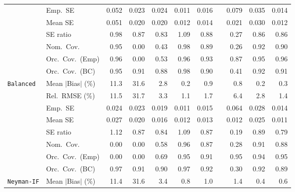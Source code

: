 \begin{landscape}
\begin{longtable}{llrrrrrrrrr}
 & Emp.\ SE & 0.052 & 0.023 & 0.024 & 0.011 & 0.016 &  & 0.079 & 0.035 & 0.014 \\
 & Mean SE & 0.051 & 0.020 & 0.020 & 0.012 & 0.014 &  & 0.021 & 0.030 & 0.012 \\
 & SE ratio & \cellcolor{rankone}0.98 & 0.87 & 0.83 & \cellcolor{ranktwo}1.09 & \cellcolor{rankthree}0.88 &  & 0.27 & 0.86 & 0.86 \\
 & Nom.\ Cov. & \cellcolor{rankone}0.95 & 0.00 & 0.43 & \cellcolor{ranktwo}0.98 & 0.89 &  & 0.26 & \cellcolor{ranktwo}0.92 & \cellcolor{rankthree}0.90 \\
 & Orc.\ Cov.\ (Emp) & \cellcolor{ranktwo}0.96 & 0.00 & 0.53 & \cellcolor{ranktwo}0.96 & \cellcolor{rankthree}0.93 &  & 0.87 & \cellcolor{rankone}0.95 & \cellcolor{ranktwo}0.96 \\
 & Orc.\ Cov.\ (BC) & \cellcolor{rankone}0.95 & \cellcolor{rankthree}0.91 & 0.88 & \cellcolor{ranktwo}0.98 & 0.90 &  & 0.41 & \cellcolor{ranktwo}0.92 & \cellcolor{rankthree}0.91 \\
\addlinespace[2pt]
\quad \texttt{Balanced} & Mean $|$Bias$|$ (\%) & 11.3 & 31.6 & 2.8 & \cellcolor{rankone}0.2 & 0.9 &  & \cellcolor{rankthree}0.8 & \cellcolor{rankone}0.2 & \cellcolor{ranktwo}0.3 \\
 & Rel.\ RMSE (\%) & 11.5 & 31.7 & 3.3 & \cellcolor{rankone}1.1 & \cellcolor{rankthree}1.7 &  & 6.4 & 2.8 & \cellcolor{ranktwo}1.4 \\
 & Emp.\ SE & 0.024 & 0.023 & 0.019 & 0.011 & 0.015 &  & 0.064 & 0.028 & 0.014 \\
 & Mean SE & 0.027 & 0.020 & 0.016 & 0.012 & 0.013 &  & 0.012 & 0.025 & 0.011 \\
 & SE ratio & \cellcolor{rankthree}1.12 & 0.87 & 0.84 & \cellcolor{rankone}1.09 & 0.87 &  & 0.19 & \cellcolor{ranktwo}0.89 & 0.79 \\
 & Nom.\ Cov. & 0.00 & 0.00 & 0.58 & \cellcolor{rankone}0.96 & 0.87 &  & 0.28 & \cellcolor{ranktwo}0.91 & \cellcolor{rankthree}0.88 \\
 & Orc.\ Cov.\ (Emp) & 0.00 & 0.00 & 0.69 & \cellcolor{rankone}0.95 & \cellcolor{rankthree}0.91 &  & \cellcolor{rankone}0.95 & \cellcolor{ranktwo}0.94 & \cellcolor{rankone}0.95 \\
 & Orc.\ Cov.\ (BC) & \cellcolor{rankone}0.97 & \cellcolor{rankthree}0.91 & 0.90 & \cellcolor{rankone}0.97 & \cellcolor{ranktwo}0.92 &  & 0.30 & \cellcolor{ranktwo}0.92 & 0.89 \\
\addlinespace[2pt]
\quad \texttt{Neyman-IF} & Mean $|$Bias$|$ (\%) & 11.4 & 31.6 & 3.4 & \cellcolor{rankthree}0.8 & 1.0 &  & 1.4 & \cellcolor{rankone}0.4 & \cellcolor{ranktwo}0.6 \\

\end{longtable}
\end{landscape}
